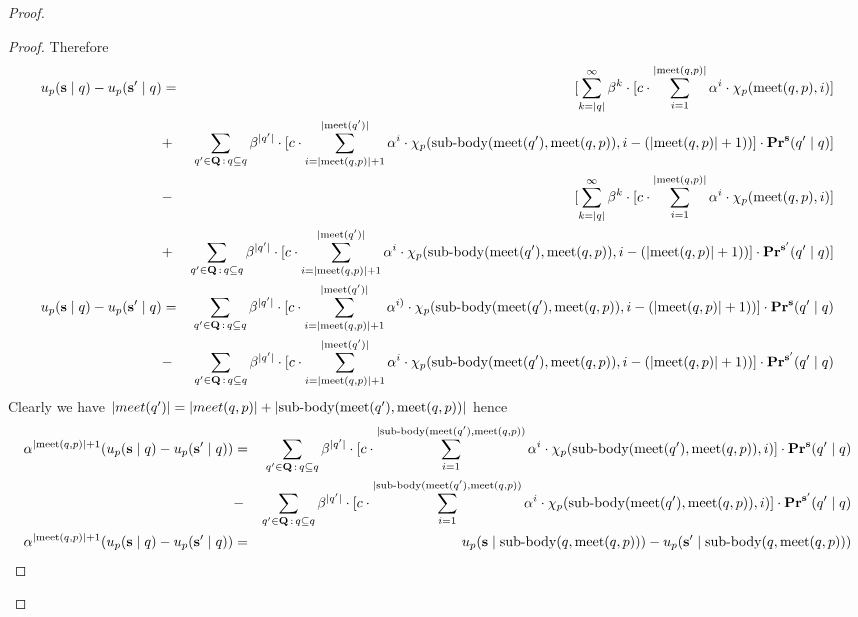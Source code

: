\begin{proof}
\begin{proof}
Therefore
\begin{eqnarray*}
	u_p(\mathbf{s} \mid q) - u_p(\mathbf{s}' \mid q) & = & [\sum_{k = |q|}^{\infty} \beta^{k} \cdot  [{\displaystyle c \cdot \sum_{i=1}^{|\text{\rm meet}(q,p)|} \alpha^i \cdot \chi_p(\text{\rm meet}(q,p),i) }] \\
	&+ & \sum_{q' \in \mathbf{Q} \,:\, q \subseteq q} \beta^{|q'|} \cdot  [{\displaystyle c \cdot \sum_{i=|\text{\rm meet}(q,p)|+1}^{|\text{\rm meet}(q')|} \alpha^{i} \cdot \chi_p({\text{\rm sub-body}}(\text{\rm meet}(q'),\text{\rm meet}(q,p)),i-(|\text{\rm meet}(q,p)|+1))  }] \cdot \mathbf{Pr}^{\mathbf{s}}(q' \mid q) ]\\ 
	&- &[\sum_{k = |q|}^{\infty} \beta^{k} \cdot  [{\displaystyle c \cdot \sum_{i=1}^{|\text{\rm meet}(q,p)|} \alpha^i \cdot \chi_p(\text{\rm meet}(q,p),i) }] \\
	&+ & \sum_{q' \in \mathbf{Q} \,:\, q \subseteq q} \beta^{|q'|} \cdot  [{\displaystyle c \cdot \sum_{i=|\text{\rm meet}(q,p)|+1}^{|\text{\rm meet}(q')|} \alpha^{i} \cdot \chi_p({\text{\rm sub-body}}(\text{\rm meet}(q'),\text{\rm meet}(q,p)),i-(|\text{\rm meet}(q,p)|+1))  }] \cdot \mathbf{Pr}^{\mathbf{s}'}(q' \mid q) ]\\ 
	u_p(\mathbf{s} \mid q) - u_p(\mathbf{s}' \mid q) & = & \sum_{q' \in \mathbf{Q} \,:\, q \subseteq q} \beta^{|q'|} \cdot  [{\displaystyle c \cdot \sum_{i=|\text{\rm meet}(q,p)|+1}^{|\text{\rm meet}(q')|} \alpha^{i)} \cdot \chi_p({\text{\rm sub-body}}(\text{\rm meet}(q'),\text{\rm meet}(q,p)),i-(|\text{\rm meet}(q,p)|+1))  }] \cdot \mathbf{Pr}^{\mathbf{s}}(q' \mid q) \\ 
	& - & \sum_{q' \in \mathbf{Q} \,:\, q \subseteq q} \beta^{|q'|} \cdot  [{\displaystyle c \cdot \sum_{i=|\text{\rm meet}(q,p)|+1}^{|\text{\rm meet}(q')|} \alpha^{i} \cdot \chi_p({\text{\rm sub-body}}(\text{\rm meet}(q'),\text{\rm meet}(q,p)),i-(|\text{\rm meet}(q,p)|+1))  }] \cdot \mathbf{Pr}^{\mathbf{s}'}(q' \mid q) \\
\end{eqnarray*}
Clearly we have $|meet(q')| = |meet(q,p)| + |{\text{\rm sub-body}}(\text{\rm meet}(q'),\text{\rm meet}(q,p))| $ hence 
\begin{eqnarray*}
	 \alpha^{|\text{\rm meet}(q,p)|+1} (u_p(\mathbf{s} \mid q) - u_p(\mathbf{s}' \mid q)) & = & \sum_{q' \in \mathbf{Q} \,:\, q \subseteq q} \beta^{|q'|} \cdot  [{\displaystyle c \cdot \sum_{i=1}^{|{\text{\rm sub-body}}(\text{\rm meet}(q'),\text{\rm meet}(q,p))} \alpha^{i} \cdot \chi_p({\text{\rm sub-body}}(\text{\rm meet}(q'),\text{\rm meet}(q,p)),i)  }] \cdot \mathbf{Pr}^{\mathbf{s}}(q' \mid q) \\ 
	& - & \sum_{q' \in \mathbf{Q} \,:\, q \subseteq q} \beta^{|q'|} \cdot  [{\displaystyle c \cdot \sum_{i=1}^{|{\text{\rm sub-body}}(\text{\rm meet}(q'),\text{\rm meet}(q,p))} \alpha^{i} \cdot \chi_p({\text{\rm sub-body}}(\text{\rm meet}(q'),\text{\rm meet}(q,p)),i)  }] \cdot \mathbf{Pr}^{\mathbf{s}'}(q' \mid q) \\
	\alpha^{|\text{\rm meet}(q,p)|+1} (u_p(\mathbf{s} \mid q) - u_p(\mathbf{s}' \mid q)) & = & u_p(\mathbf{s} \mid {\text{\rm sub-body}}(q,\text{\rm meet}(q,p))) - u_p(\mathbf{s}' \mid {\text{\rm sub-body}}(q,\text{\rm meet}(q,p))) \\
\end{eqnarray*}
\end{proof}




\end{proof}
